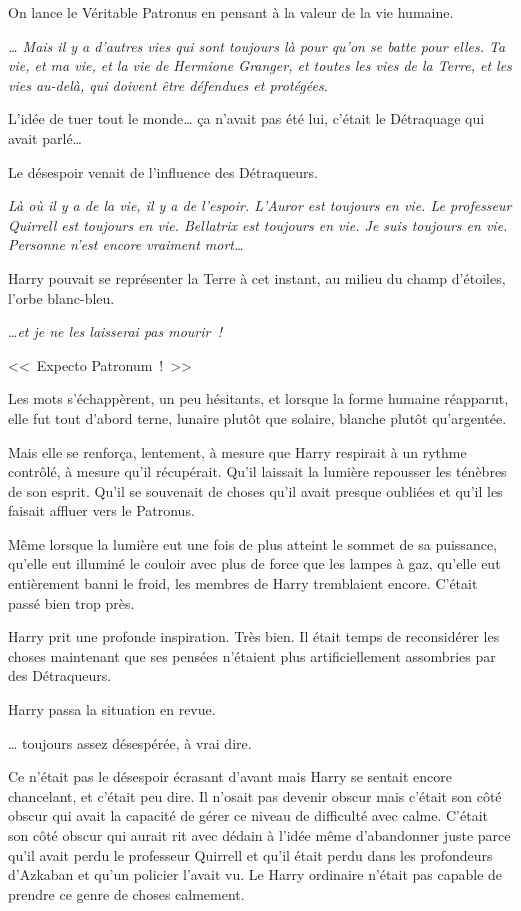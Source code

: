 On lance le Véritable Patronus en pensant à la valeur de la vie humaine.

\emph{… Mais il y a d'autres vies qui sont toujours là pour qu'on se batte pour elles. Ta vie, et ma vie, et la vie de Hermione Granger, et toutes les vies de la Terre, et les vies au-delà, qui doivent être défendues et protégées.}

L'idée de tuer tout le monde… ça n'avait pas été lui, c'était le Détraquage qui avait parlé…

Le désespoir venait de l'influence des Détraqueurs.

\emph{Là où il y a de la vie, il y a de l'espoir. L'Auror est toujours en vie. Le professeur Quirrell est toujours en vie. Bellatrix est toujours en vie. Je suis toujours en vie. Personne n'est encore vraiment mort…}

Harry pouvait se représenter la Terre à cet instant, au milieu du champ d'étoiles, l'orbe blanc-bleu.

…\emph{et je ne les laisserai pas mourir~!}

<<~Expecto Patronum~!~>>

Les mots s'échappèrent, un peu hésitants, et lorsque la forme humaine réapparut, elle fut tout d'abord terne, lunaire plutôt que solaire, blanche plutôt qu'argentée.

Mais elle se renforça, lentement, à mesure que Harry respirait à un rythme contrôlé, à mesure qu'il récupérait. Qu'il laissait la lumière repousser les ténèbres de son esprit. Qu'il se souvenait de choses qu'il avait presque oubliées et qu'il les faisait affluer vers le Patronus.

Même lorsque la lumière eut une fois de plus atteint le sommet de sa puissance, qu'elle eut illuminé le couloir avec plus de force que les lampes à gaz, qu'elle eut entièrement banni le froid, les membres de Harry tremblaient encore. C'était passé bien trop près.

Harry prit une profonde inspiration. Très bien. Il était temps de reconsidérer les choses maintenant que ses pensées n'étaient plus artificiellement assombries par des Détraqueurs.

Harry passa la situation en revue.

… toujours assez désespérée, à vrai dire.

Ce n'était pas le désespoir écrasant d'avant mais Harry se sentait encore chancelant, et c'était peu dire. Il n'osait pas devenir obscur mais c'était son côté obscur qui avait la capacité de gérer ce niveau de difficulté avec calme. C'était son côté obscur qui aurait rit avec dédain à l'idée même d'abandonner juste parce qu'il avait perdu le professeur Quirrell et qu'il était perdu dans les profondeurs d'Azkaban et qu'un policier l'avait vu. Le Harry ordinaire n'était pas capable de prendre ce genre de choses calmement.

